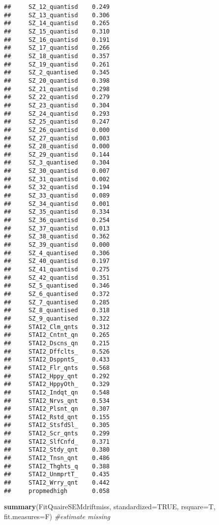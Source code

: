 \documentclass[]{article}
\newenvironment{Shaded}{\begin{snugshade}}{\end{snugshade}}
\newcommand{\KeywordTok}[1]{\textcolor[rgb]{0.13,0.29,0.53}{\textbf{#1}}}
\newcommand{\DataTypeTok}[1]{\textcolor[rgb]{0.13,0.29,0.53}{#1}}
\newcommand{\CommentTok}[1]{\textcolor[rgb]{0.56,0.35,0.01}{\textit{#1}}}
\newcommand{\OtherTok}[1]{\textcolor[rgb]{0.56,0.35,0.01}{#1}}
\newcommand{\NormalTok}[1]{#1}
\begin{document}
\begin{verbatim}
##     SZ_12_quantisd    0.249
##     SZ_13_quantisd    0.306
##     SZ_14_quantisd    0.265
##     SZ_15_quantisd    0.310
##     SZ_16_quantisd    0.191
##     SZ_17_quantisd    0.266
##     SZ_18_quantisd    0.357
##     SZ_19_quantisd    0.261
##     SZ_2_quantised    0.345
##     SZ_20_quantisd    0.398
##     SZ_21_quantisd    0.298
##     SZ_22_quantisd    0.279
##     SZ_23_quantisd    0.304
##     SZ_24_quantisd    0.293
##     SZ_25_quantisd    0.247
##     SZ_26_quantisd    0.000
##     SZ_27_quantisd    0.003
##     SZ_28_quantisd    0.000
##     SZ_29_quantisd    0.144
##     SZ_3_quantised    0.304
##     SZ_30_quantisd    0.007
##     SZ_31_quantisd    0.002
##     SZ_32_quantisd    0.194
##     SZ_33_quantisd    0.089
##     SZ_34_quantisd    0.001
##     SZ_35_quantisd    0.334
##     SZ_36_quantisd    0.254
##     SZ_37_quantisd    0.013
##     SZ_38_quantisd    0.362
##     SZ_39_quantisd    0.000
##     SZ_4_quantised    0.306
##     SZ_40_quantisd    0.197
##     SZ_41_quantisd    0.275
##     SZ_42_quantisd    0.351
##     SZ_5_quantised    0.346
##     SZ_6_quantised    0.372
##     SZ_7_quantised    0.285
##     SZ_8_quantised    0.318
##     SZ_9_quantised    0.322
##     STAI2_Clm_qnts    0.312
##     STAI2_Cntnt_qn    0.265
##     STAI2_Dscns_qn    0.215
##     STAI2_Dffclts_    0.526
##     STAI2_DsppntS_    0.433
##     STAI2_Flr_qnts    0.568
##     STAI2_Hppy_qnt    0.292
##     STAI2_HppyOth_    0.329
##     STAI2_Indqt_qn    0.548
##     STAI2_Nrvs_qnt    0.534
##     STAI2_Plsnt_qn    0.307
##     STAI2_Rstd_qnt    0.155
##     STAI2_StsfdSl_    0.305
##     STAI2_Scr_qnts    0.299
##     STAI2_SlfCnfd_    0.371
##     STAI2_Stdy_qnt    0.380
##     STAI2_Tnsn_qnt    0.486
##     STAI2_Thghts_q    0.388
##     STAI2_UnmprtT_    0.435
##     STAI2_Wrry_qnt    0.442
##     propmedhigh       0.058
\end{verbatim}

\begin{Shaded}
\begin{Highlighting}[]
\KeywordTok{summary}\NormalTok{(FitQuaireSEMdriftmiss, }\DataTypeTok{standardized=}\OtherTok{TRUE}\NormalTok{, }\DataTypeTok{rsquare=}\NormalTok{T, }\DataTypeTok{fit.measures=}\NormalTok{F) }\CommentTok{#estimate missing}
\end{Highlighting}
\end{Shaded}
\end{document}
